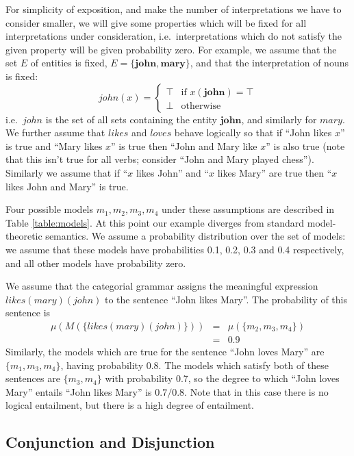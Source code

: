 \documentclass[letterpaper]{article}
\begin{document}
For simplicity of exposition, and make the number of interpretations
we have to consider smaller, we will give some properties which will
be fixed for all interpretations under consideration,
i.e.~interpretations which do not satisfy the given property will be
given probability zero. For example, we assume that the set $E$ of
entities is fixed, $E = \{\mathbf{john}, \mathbf{mary}\}$, and that
the interpretation of nouns is fixed:
$$\mathit{john}(x) = \begin{cases}
\top & \text{if } x(\mathbf{john}) = \top\\
\bot & \text{otherwise}
\end{cases}$$ i.e.~$\mathit{john}$ is the set of all sets containing
the entity $\mathbf{john}$, and similarly for $\mathit{mary}$. We
further assume that $\mathit{likes}$ and $\mathit{loves}$ behave
logically so that if ``John likes $x$'' is true and ``Mary likes $x$''
is true then ``John and Mary like $x$'' is also true (note that this
isn't true for all verbs; consider ``John and Mary played
chess''). Similarly we assume that if ``$x$ likes John'' and ``$x$
likes Mary'' are true then ``$x$ likes John and Mary'' is true.

Four possible models $m_1, m_2, m_3, m_4$ under these assumptions are
described in Table \ref{table:models}. At this point our example
diverges from standard model-theoretic semantics. We assume a
probability distribution over the set of models: we assume that these
models have probabilities 0.1, 0.2, 0.3 and 0.4 respectively, and all
other models have probability zero.

We assume that the categorial grammar assigns the meaningful
expression $\mathit{likes}(\mathit{mary})(\mathit{john})$ to the
sentence ``John likes Mary''. The probability of this sentence is
\begin{eqnarray*}
\mu(M(\{\mathit{likes}(\mathit{mary})(\mathit{john})\})) &=&
\mu(\{m_2, m_3, m_4\})\\
&=&0.9
\end{eqnarray*}
Similarly, the models which are true for the sentence ``John loves
Mary'' are $\{m_1, m_3, m_4\}$, having probability 0.8. The models
which satisfy both of these sentences are $\{m_3, m_4\}$ with
probability 0.7, so the
degree to which ``John loves Mary'' entails ``John likes Mary'' is
$0.7/0.8$. Note that in this case there is no logical entailment, but
there is a high degree of entailment.

\subsection{Conjunction and Disjunction}
\end{document}
